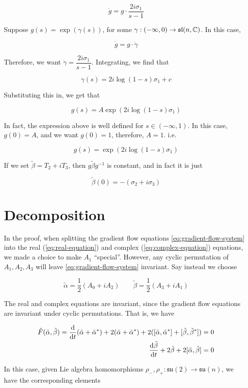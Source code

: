 \documentclass{report}
\newcommand{\su}{\mathfrak{su}}
\renewcommand{\sl}{\mathfrak{sl}}
\begin{document}
\[\dot g = g \cdot \frac{2i\sigma_1}{s-1}\]

Suppose \(g(s) = \exp(\gamma(s))\), for some \(\gamma : (-\infty, 0) \to \sl(n, \C)\). In this case,

\[\dot g = g \cdot \dot\gamma\]

Therefore, we want \(\dot\gamma = \dfrac{2i\sigma_1}{s-1}\). Integrating, we find that

\[\gamma(s) = 2i\log(1-s)\sigma_1 + c\]

Substituting this in, we get that

\[g(s) = A\exp(2i\log(1-s)\sigma_1)\]

In fact, the expression above is well defined for \(s \in (-\infty, 1)\). In this case, \(g(0) = A\), and we want \(g(0) = 1\), therefore, \(A = 1\). i.e. 

\[g(s) = \exp(2i\log(1-s)\sigma_1)\]

If we set \(\tilde\beta = T_2 + iT_3\), then \(g\tilde\beta g^{-1}\) is constant, and in fact it is just

\[\tilde\beta(0) = -(\sigma_2 + i\sigma_3)\]

\section{Decomposition}

In the proof, when splitting the gradient flow equations \cref{eq:gradient-flow-system} into the real (\cref{eq:real-equation}) and complex (\cref{eq:complex-equation}) equations, we made a choice to make \(A_1\) ``special''. However, any cyclic permutation of \(A_1, A_2, A_3\) will leave \cref{eq:gradient-flow-system} invariant. Say instead we choose

\[\tilde\alpha = \frac12(A_0 + iA_2) \qquad \tilde\beta = \frac12(A_3 + iA_1)\]

The real and complex equations are invariant, since the gradient flow equations are invariant under cyclic permutations. That is, we have

\begin{align*}
    \hat F(\tilde\alpha, \tilde\beta) = \dv{t}(\tilde\alpha + \tilde\alpha^*) + 2(\tilde\alpha + \tilde\alpha^*) + 2([\tilde\alpha, \tilde\alpha^*] + [\tilde\beta, \tilde\beta^*]) &= 0\\
    \dv{\tilde\beta}{t} + 2\tilde\beta + 2[\tilde\alpha, \tilde\beta] &= 0 
\end{align*}

In this case, given Lie algebra homomorphisms \(\rho_-, \rho_+ : \su(2) \to \su(n)\), we have the corresponding elements
\end{document}
